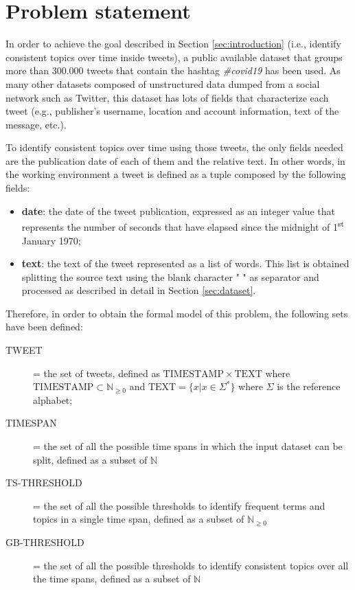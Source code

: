 \section{Problem statement}
\label{sec:problem_statement}
In order to achieve the goal described in Section \ref{sec:introduction} (i.e., identify consistent topics over time inside tweets), a public available dataset that groups more than 300.000 tweets that contain the hashtag \textit{\#covid19} \cite{covid19-tweets-dataset} has been used. As many other datasets composed of unstructured data dumped from a social network such as Twitter, this dataset has lots of fields that characterize each tweet (e.g., publisher's username, location and account information, text of the message, etc.). 

To identify consistent topics over time using those tweets, the only fields needed are the publication date of each of them and the relative text. In other words, in the working environment a tweet is defined as a tuple composed by the following fields:
\begin{itemize}
	\item \textbf{date}: the date of the tweet publication, expressed as an integer value that represents the number of seconds that have elapsed since the midnight of 1\textsuperscript{st} January 1970;
	\item \textbf{text}: the text of the tweet represented as a list of words. This list is obtained splitting the source text using the blank character " " as separator and processed as described in detail in Section \ref{sec:dataset}.
\end{itemize}

\noindent Therefore, in order to obtain the formal model of this problem, the following sets have been defined:
\begin{description}
	\item[TWEET] = the set of tweets, defined as $\mathrm{TIMESTAMP} \times \mathrm{TEXT}$ where $\mathrm{TIMESTAMP}\subset\mathbb{N}_{\geq 0}$ and $\mathrm{TEXT}=\{x | x \in \Sigma^*\}$ where $\Sigma$ is the reference alphabet;
	\item[TIMESPAN] = the set of all the possible time spans in which the input dataset can be split, defined as a subset of $\mathbb{N}$
	\item[TS-THRESHOLD] = the set of all the possible thresholds to identify frequent terms and topics in a single time span, defined as a subset of $\mathbb{N}_{\geq 0}$
	\item[GB-THRESHOLD] = the set of all the possible thresholds to identify consistent topics over all the time spans, defined as a subset of $\mathbb{N}$
\end{description}


